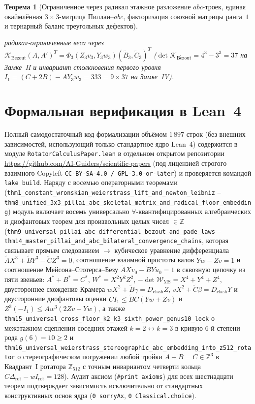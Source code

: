 \documentclass[11pt,a4paper]{article}
\theoremstyle{plain}
\newtheorem{theorem}{Теорема}[section]
\theoremstyle{definition}
\begin{document}
\begin{theorem}[Ограниченное через радикал этажное разложение $abc$-троек, единая окаймлённая $3\times 3$-матрица Пиллаи--$abc$, факторизация союзной матрицы ранга~$1$ и тернарный баланс треугольных дефектов]
\begin{enumerate}[label=\textbf{(\roman*)},leftmargin=*]
радикал-ограниченные веса через $\mathcal{K}_{\mathrm{B\acute{e}zout}}(A,A')^T = \Phi_3(Z_3 v_3, Y_3 w_3)(\widetilde{B}_3,\widetilde{C}_3)^T$ ($\det\mathcal{K}_{\mathrm{B\acute{e}zout}} = 4^3-3^3 = 37$ на Замке~II и инвариант столкновения первого уровня $I_1 = (C+2B)-A Y_3 w_3 = 333 = 9\times 37$ на Замке~IV).
\end{enumerate}
\end{theorem}

\section{Формальная верификация в Lean~4}
\label{sec:lean4}

Полный самодостаточный код формализации объёмом $1\,897$ строк (без внешних зависимостей, использующий только стандартное ядро Lean~4) содержится в модуле \texttt{RotatorCalculusPaper.lean} в отдельном открытом репозитории \url{https://github.com/AI-Guiders/scientific-papers} (под лицензией строгого взаимного Copyleft \texttt{CC-BY-SA-4.0 / GPL-3.0-or-later}) и проверяется командой \texttt{lake build}. Наряду с восемью операторными теоремами (\texttt{thm1\_constant\_wronskian\_weierstrass\_lift\_and\_newton\_leibniz} -- \texttt{thm8\_unified\_3x3\_pillai\_abc\_skeletal\_matrix\_and\_radical\_floor\_embedding}) модуль включает восемь универсально $\forall$-квантифицированных алгебраических и диофантовых теорем для произвольных целых чисел $\in\mathbb{Z}$ (\texttt{thm9\_universal\_pillai\_abc\_differential\_bezout\_and\_pade\_laws} -- \texttt{thm14\_master\_pillai\_and\_abc\_bilateral\_convergence\_chains}, которая связывает прямым следованием $\to$ кубическое уравнение дифференциала $\widetilde{A}X^3+\widetilde{B}Y^3-\widetilde{C}Z^3=0$, соотношение взаимной простоты валов $Yw-Zv=1$ и соотношение Мейсона--Стотерса--Безу $\widetilde{A}Xv_0-\widetilde{B}Yu_0=1$ в сквозную цепочку из пяти звеньев: $A^*+B^*=C^*$, $W^* = X^2 Y^2 Z^2$, $-\det\mathcal{W}_{\mathrm{MS}} = X^4+Y^4+Z^4$, двустороннее схождение Крамера $w X^2 + \widetilde{B}\gamma = D_{\mathrm{clash}} Z$, $v X^2 + \widetilde{C}\beta = D_{\mathrm{clash}} Y$ и двусторонние диофантовы оценки $C I_1 \le \widetilde{B}\widetilde{C}(Yw+Zv)$ и $Z^3(-I_1) \le A w^3(2Zv-Yw)$, а также \texttt{thm15\_universal\_cross\_floor\_k2\_k3\_sixth\_power\_genus10\_lock} о межэтажном сцеплении соседних этажей $k=2 \leftrightarrow k=3$ в кривую 6-й степени рода $g(6)=10\ge 2$ и \texttt{thm16\_universal\_weierstrass\_stereographic\_abc\_embedding\_into\_z512\_rotator} о стереографическом погружении любой тройки $A+B=C\in\mathbb{Z}^3$ в Квадрант~I ротатора $\mathbb{Z}_{512}$ с точным инвариантом четверти кольца $C\Delta_{\mathrm{rot}} - w I_{\mathrm{rot}} = 128$). Аудит аксиом (\texttt{\#print axioms}) для всех шестнадцати теорем подтверждает зависимость исключительно от стандартных конструктивных основ ядра (\texttt{0 sorryAx}, \texttt{0 Classical.choice}).
\end{document}
